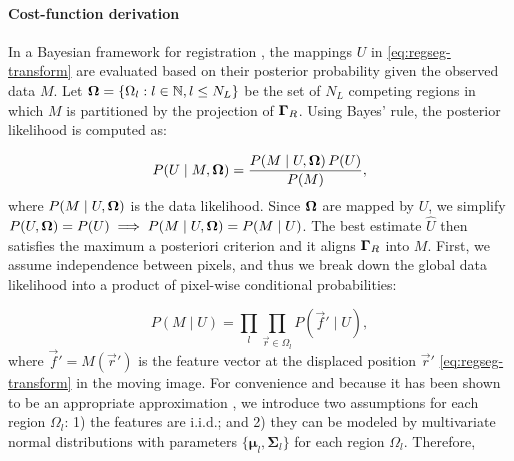 \paragraph*{Cost-function derivation}
In a Bayesian framework for registration \citep{wyatt_map_2003,pohl_bayesian_2006,gass_simultaneous_2014},
  the mappings $U$ in \eqref{eq:regseg-transform} are
  evaluated based on their posterior probability given the observed data
  $M$.
Let $\boldsymbol{\Omega} = \{\Omega_l: l \in \mathbb{N}, l \leq N_L\}$ be the set of $N_L$ competing regions in
  which $M$ is partitioned by the projection of $\boldsymbol{\Gamma}_R$.
Using Bayes' rule, the posterior likelihood is computed as:

  \begin{equation}
  P(U \mid M, \boldsymbol{\Omega} ) = \frac{P(M \mid U,\boldsymbol{\Omega} )\, P(U)}{P(M)},
  \label{eq:regseg-bayes_rule}
  \end{equation}
  where $P(M \mid U,\boldsymbol{\Omega})$ is the data likelihood.
Since $\boldsymbol{\Omega}$ are mapped by $U$, we simplify
  $P(U, \boldsymbol{\Omega}) = P(U) \implies P(M \mid U,\boldsymbol{\Omega}) = P(M \mid U)$.
The best estimate $\hat{U}$ then satisfies the maximum a posteriori criterion
  and it aligns $\boldsymbol{\Gamma}_R$ into $M$.
First, we assume independence between pixels, and thus we break down the
  global data likelihood into a product of pixel-wise conditional probabilities:

  \begin{equation}
  P(M \mid U) = \underset{l}{\prod} \underset{\vec{r}\in \Omega_l}{\prod}
    P\left( \vec{f}' \mid U \right),
  \label{eq:regseg-bayes_aposteriori}
  \end{equation}
  where $\vec{f}' = M(\vec{r}')$ is the feature vector at the displaced
  position $\vec{r}'$ \eqref{eq:regseg-transform} in the moving image.
For convenience and because it has been shown to be an appropriate approximation
  \citep{leemput_automated_1999,cuadra_comparison_2005}, we introduce two assumptions for each
  region $\Omega_l$:
  1) the features are i.i.d.; and 2) they can be modeled by multivariate normal
  distributions \citep{esteban_mbis_2014} with parameters
  $\lbrace \boldsymbol{\mu}_l, \boldsymbol{\Sigma}_{l} \rbrace$
  for each region $\Omega_l$.
 Therefore,

